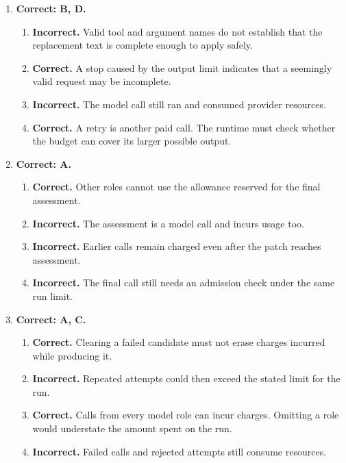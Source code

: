 \begin{enumerate}[start=51,itemsep=0.7\baselineskip]
\item[{\hyperref[exercise:57]{57.}}] \begin{minipage}[t]{\linewidth}
\textbf{Correct: B, D.}
\begin{enumerate}[label=\textnormal{(\Alph*)},leftmargin=*,itemsep=0pt]
\item \textbf{Incorrect.} Valid tool and argument names do not establish that the replacement text is complete enough to apply safely.
\item \textbf{Correct.} A stop caused by the output limit indicates that a seemingly valid request may be incomplete.
\item \textbf{Incorrect.} The model call still ran and consumed provider resources.
\item \textbf{Correct.} A retry is another paid call. The runtime must check whether the budget can cover its larger possible output.
\end{enumerate}
\end{minipage}

\item[{\hyperref[exercise:58]{58.}}] \begin{minipage}[t]{\linewidth}
\textbf{Correct: A.}
\begin{enumerate}[label=\textnormal{(\Alph*)},leftmargin=*,itemsep=0pt]
\item \textbf{Correct.} Other roles cannot use the allowance reserved for the final assessment.
\item \textbf{Incorrect.} The assessment is a model call and incurs usage too.
\item \textbf{Incorrect.} Earlier calls remain charged even after the patch reaches assessment.
\item \textbf{Incorrect.} The final call still needs an admission check under the same run limit.
\end{enumerate}
\end{minipage}

\item[{\hyperref[exercise:59]{59.}}] \begin{minipage}[t]{\linewidth}
\textbf{Correct: A, C.}
\begin{enumerate}[label=\textnormal{(\Alph*)},leftmargin=*,itemsep=0pt]
\item \textbf{Correct.} Clearing a failed candidate must not erase charges incurred while producing it.
\item \textbf{Incorrect.} Repeated attempts could then exceed the stated limit for the run.
\item \textbf{Correct.} Calls from every model role can incur charges. Omitting a role would understate the amount spent on the run.
\item \textbf{Incorrect.} Failed calls and rejected attempts still consume resources.
\end{enumerate}
\end{minipage}


\end{enumerate}

